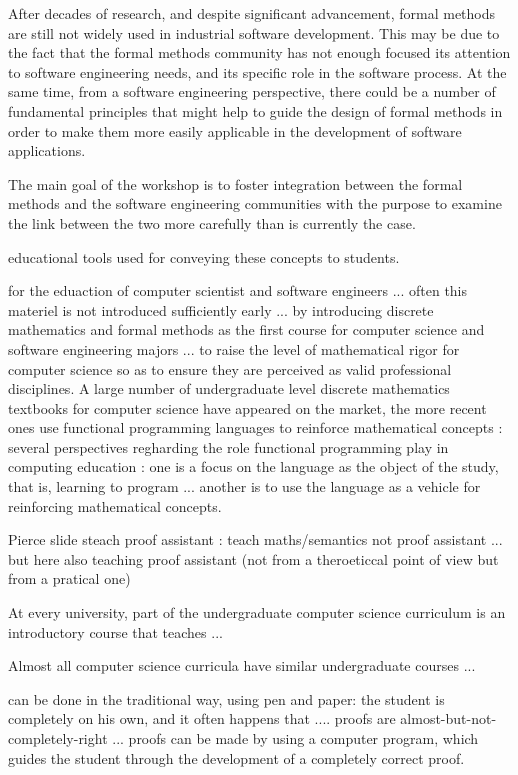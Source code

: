 \documentclass[submission,copyright,creativecommons]{eptcs}
\begin{document}
After decades of research, and despite significant advancement, formal methods
are still not widely used in industrial software development. This may be due
to the fact that the formal methods community has not enough focused its
attention to software engineering needs, and its specific role in the software
process. At the same time, from a software engineering perspective, there could
be a number of fundamental principles that might help to guide the design of
formal methods in order to make them more easily applicable in the development
of software applications.

The main goal of the workshop is to foster integration between the formal
methods and the software engineering communities with the purpose to examine
the link between the two more carefully than is currently the case.


educational tools used for conveying these concepts to students.

for the eduaction of computer scientist and software engineers
... often this materiel is not introduced sufficiently early ... by
introducing discrete mathematics and formal methods as the first
course for computer science and software engineering majors ... to
raise the level of mathematical rigor for computer science so as to
ensure they are perceived as valid professional disciplines.
A large number of undergraduate level discrete mathematics textbooks
for computer science have appeared on the market, the more recent ones
use functional programming languages to reinforce mathematical
concepts :  several perspectives regharding the role functional
programming play in computing education : one is a focus on the
language as the object of the study, that is, learning to program
... another is to use the language as a vehicle for reinforcing
mathematical concepts.

Pierce slide steach proof assistant : teach maths/semantics not proof
assistant ... but here also teaching proof assistant (not from a
theroeticcal point of view but from a pratical one)

At every university, part of the undergraduate computer science
curriculum is an introductory course that teaches ...

Almost all computer science curricula have similar undergraduate
courses ...

can be done in the traditional way, using pen and paper: the student
is completely on his own, and it often happens that .... proofs are
almost-but-not-completely-right ... proofs can be made by using a
computer program, which guides the student through the development of
a completely correct proof.
\end{document}
